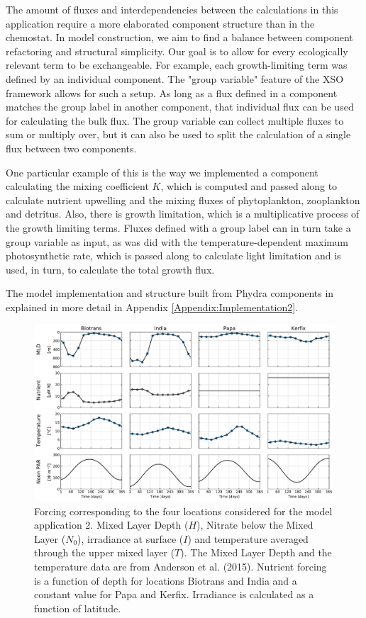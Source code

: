 \documentclass[journal abbreviation, manuscript]{copernicus}
\begin{document}
The amount of fluxes and interdependencies between the calculations in this application require a more elaborated component structure than in the chemostat. In model construction, we aim to find a balance between component refactoring and structural simplicity. Our goal is to allow for every ecologically relevant term to be exchangeable. For example, each growth-limiting term was defined by an individual component. The "group variable" feature of the XSO framework allows for such a setup. As long as a flux defined in a component matches the group label in another component, that individual flux can be used for calculating the bulk flux. The group variable can collect multiple fluxes to sum or multiply over, but it can also be used to split the calculation of a single flux between two components.

One particular example of this is the way we implemented a component calculating the mixing coefficient $K$, which is computed and passed along to calculate nutrient upwelling and the mixing fluxes of phytoplankton, zooplankton and detritus. Also, there is growth limitation, which is a multiplicative process of the growth limiting terms. Fluxes defined with a group label can in turn take a group variable as input, as was did with the temperature-dependent maximum photosynthetic rate, which is passed along to calculate light limitation and is used, in turn, to calculate the total growth flux. 

The model implementation and structure built from Phydra components in explained in more detail in Appendix \ref{Appendix:Implementation2}.
\begin{figure}[t]
\includegraphics[width=15cm]{Figures/firstdraft_plots/02_EMPOWER_forcing.pdf}
\caption{Forcing corresponding to the four locations considered for the model application 2. Mixed Layer Depth ($H$), Nitrate below the Mixed Layer ($N_0$), irradiance at surface ($I$) and temperature averaged through the upper mixed layer ($T$). The Mixed Layer Depth and the temperature data are from Anderson et al. (2015). Nutrient forcing is a function of depth for locations Biotrans and India and a constant value for Papa and Kerfix. Irradiance is calculated as a function of latitude.}
\label{Figure:EMPOWERforcing}
\end{figure}
\end{document}
